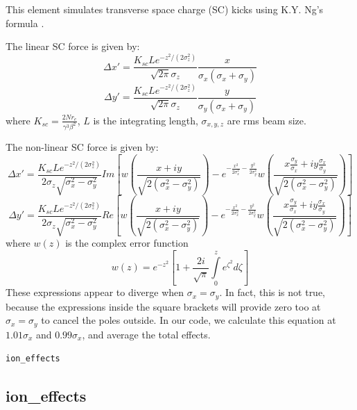 \documentclass[11pt]{article}
\begin{document}
This element simulates transverse space charge (SC) kicks using K.Y. Ng's formula \cite{Xiao2007a}.

The linear SC force is given by:
\[
\Delta x'=\frac{K_{sc}Le^{-z^2/(2\sigma_z^2)}}{\sqrt{2\pi}\sigma_z}
\frac{x}{\sigma_x(\sigma_x+\sigma_y)}
\]
\begin{equation}
\Delta y'=\frac{K_{sc}Le^{-z^2/(2\sigma_z^2)}}{\sqrt{2\pi}\sigma_z}
\frac{y}{\sigma_y(\sigma_x+\sigma_y)}
\end{equation}
where $K_{sc}=\frac{2Nr_e}{\gamma^3\beta^2}$,
$L$ is the integrating length, $\sigma_{x,y,z}$ are rms beam size.

The non-linear SC force is given by:
\[
\Delta x'=\frac{K_{sc}Le^{-z^2/(2\sigma_z^2)}}{2\sigma_z\sqrt{\sigma_x^2-\sigma_y^2}}
Im\left [ w\left( \frac{x+iy}{\sqrt{2(\sigma_x^2-\sigma_y^2)}} \right)
-e^{-\frac{x^2}{2 \sigma_x^2}-\frac{y^2}{2 \sigma_y^2}}
w\left(\frac{x\frac{\sigma_y}{\sigma_x}+iy\frac{\sigma_x}{\sigma_y}}
{\sqrt{2(\sigma_x^2-\sigma_y^2)}}\right)\right ]
\]
\begin{equation}
\Delta y'=\frac{K_{sc}Le^{-z^2/(2\sigma_z^2)}}{2\sigma_z\sqrt{\sigma_x^2-\sigma_y^2}}
Re\left [ w\left( \frac{x+iy}{\sqrt{2(\sigma_x^2-\sigma_y^2)}} \right)
-e^{-\frac{x^2}{2 \sigma_x^2}-\frac{y^2}{2 \sigma_y^2}}
w\left(\frac{x\frac{\sigma_y}{\sigma_x}+iy\frac{\sigma_x}{\sigma_y}}
{\sqrt{2(\sigma_x^2-\sigma_y^2)}}\right)\right ]
\label{equa2}
\end{equation}
where $w(z)$ is the complex error function
\begin{equation}
w(z)=e^{-z^2}\left [ 1+\frac{2i}{\sqrt{\pi}}\int\limits_0^z e^{\zeta^2}d\zeta\right ]
\end{equation}
These expressions appear to diverge when $\sigma_x=\sigma_y$. In fact, this is not
true, because the expressions inside the square brackets will provide zero too at
$\sigma_x=\sigma_y$ to cancel the poles outside. In our code, we calculate this equation
at  $1.01 \sigma_x$ and $0.99\sigma_x$, and average the total effects. 
 
\newpage
\begin{center}{\Large\verb|ion_effects|}\end{center}
\subsection{ion\_effects \label{subsec:ioneffects}}
\end{document}
